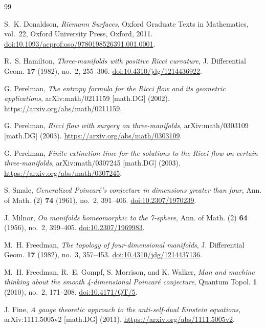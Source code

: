 \documentclass[11pt]{article}
\numberwithin{equation}{section}
\theoremstyle{definition}
\theoremstyle{remark}
\begin{document}
\begin{thebibliography}{99}
\setlength{\itemsep}{3pt plus 1pt minus 1pt}

S.~K. Donaldson,
\emph{Riemann Surfaces},
Oxford Graduate Texts in Mathematics, vol.~22,
Oxford University Press, Oxford, 2011.
\href{https://doi.org/10.1093/acprof:oso/9780198526391.001.0001}{doi:10.1093/acprof:oso/9780198526391.001.0001}.

R.~S. Hamilton,
\emph{Three-manifolds with positive Ricci curvature},
J. Differential Geom. \textbf{17} (1982), no.~2, 255--306.
\href{https://doi.org/10.4310/jdg/1214436922}{doi:10.4310/jdg/1214436922}.

G. Perelman,
\emph{The entropy formula for the Ricci flow and its geometric applications},
arXiv:math/0211159 [math.DG] (2002).
\url{https://arxiv.org/abs/math/0211159}.

G. Perelman,
\emph{Ricci flow with surgery on three-manifolds},
arXiv:math/0303109 [math.DG] (2003).
\url{https://arxiv.org/abs/math/0303109}.

G. Perelman,
\emph{Finite extinction time for the solutions to the Ricci flow on certain three-manifolds},
arXiv:math/0307245 [math.DG] (2003).
\url{https://arxiv.org/abs/math/0307245}.

S. Smale,
\emph{Generalized Poincar\'e's conjecture in dimensions greater than four},
Ann. of Math. (2) \textbf{74} (1961), no.~2, 391--406.
\href{https://doi.org/10.2307/1970239}{doi:10.2307/1970239}.

J. Milnor,
\emph{On manifolds homeomorphic to the 7-sphere},
Ann. of Math. (2) \textbf{64} (1956), no.~2, 399--405.
\href{https://doi.org/10.2307/1969983}{doi:10.2307/1969983}.

M.~H. Freedman,
\emph{The topology of four-dimensional manifolds},
J. Differential Geom. \textbf{17} (1982), no.~3, 357--453.
\href{https://doi.org/10.4310/jdg/1214437136}{doi:10.4310/jdg/1214437136}.

M.~H. Freedman, R.~E. Gompf, S. Morrison, and K. Walker,
\emph{Man and machine thinking about the smooth 4-dimensional Poincar\'e conjecture},
Quantum Topol. \textbf{1} (2010), no.~2, 171--208.
\href{https://doi.org/10.4171/QT/5}{doi:10.4171/QT/5}.

J. Fine,
\emph{A gauge theoretic approach to the anti-self-dual Einstein equations},
arXiv:1111.5005v2 [math.DG] (2011).
\url{https://arxiv.org/abs/1111.5005v2}.


\end{thebibliography}
\end{document}
